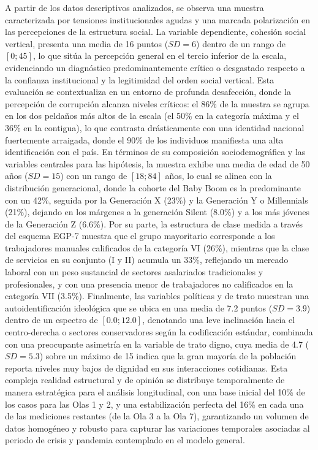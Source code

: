 \documentclass[
  spanish,
  a4paper,
  oneside]{scrbook}
\begin{document}
A partir de los datos descriptivos analizados, se observa una muestra
caracterizada por tensiones institucionales agudas y una marcada
polarización en las percepciones de la estructura social. La variable
dependiente, cohesión social vertical, presenta una media de 16 puntos
(\(SD = 6\)) dentro de un rango de \([0; 45]\), lo que sitúa la
percepción general en el tercio inferior de la escala, evidenciando un
diagnóstico predominantemente crítico o desgastado respecto a la
confianza institucional y la legitimidad del orden social vertical. Esta
evaluación se contextualiza en un entorno de profunda desafección, donde
la percepción de corrupción alcanza niveles críticos: el 86\% de la
muestra se agrupa en los dos peldaños más altos de la escala (el 50\% en
la categoría máxima y el 36\% en la contigua), lo que contrasta
drásticamente con una identidad nacional fuertemente arraigada, donde el
90\% de los individuos manifiesta una alta identificación con el país.
En términos de su composición sociodemográfica y las variables centrales
para las hipótesis, la muestra exhibe una media de edad de 50 años
(\(SD = 15\)) con un rango de \([18; 84]\) años, lo cual se alinea con
la distribución generacional, donde la cohorte del Baby Boom es la
predominante con un 42\%, seguida por la Generación X (23\%) y la
Generación Y o Millennials (21\%), dejando en los márgenes a la
generación Silent (8.0\%) y a los más jóvenes de la Generación Z
(6.6\%). Por su parte, la estructura de clase medida a través del
esquema EGP-7 muestra que el grupo mayoritario corresponde a los
trabajadores manuales calificados de la categoría VI (26\%), mientras
que la clase de servicios en su conjunto (I y II) acumula un 33\%,
reflejando un mercado laboral con un peso sustancial de sectores
asalariados tradicionales y profesionales, y con una presencia menor de
trabajadores no calificados en la categoría VII (3.5\%). Finalmente, las
variables políticas y de trato muestran una autoidentificación
ideológica que se ubica en una media de 7.2 puntos (\(SD = 3.9\)) dentro
de un espectro de \([0.0; 12.0]\), denotando una leve inclinación hacia
el centro-derecha o sectores conservadores según la codificación
estándar, combinada con una preocupante asimetría en la variable de
trato digno, cuya media de 4.7 (\(SD = 5.3\)) sobre un máximo de 15
indica que la gran mayoría de la población reporta niveles muy bajos de
dignidad en sus interacciones cotidianas. Esta compleja realidad
estructural y de opinión se distribuye temporalmente de manera
estratégica para el análisis longitudinal, con una base inicial del 10\%
de los casos para las Olas 1 y 2, y una estabilización perfecta del 16\%
en cada una de las mediciones restantes (de la Ola 3 a la Ola 7),
garantizando un volumen de datos homogéneo y robusto para capturar las
variaciones temporales asociadas al periodo de crisis y pandemia
contemplado en el modelo general.
\end{document}
